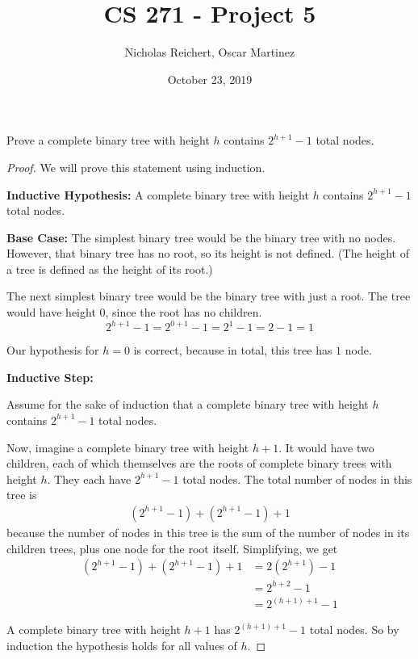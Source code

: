 \documentclass[12pt]{article}
\title{CS 271 - Project 5}
\author{Nicholas Reichert, Oscar Martinez}
\date{October 23, 2019}
\begin{document}
\maketitle

\section{}

Prove a complete binary tree with height $h$ contains $2^{h+1} - 1$ total nodes.

\begin{proof}
We will prove this statement using induction.
\bigskip

\textbf{Inductive Hypothesis: } A complete binary tree with height $h$ contains $2^{h+1} - 1$ total nodes.

\bigskip
\textbf{Base Case: } The simplest binary tree would be the binary tree with no nodes.  However, that binary tree has no root, so its height is not defined. (The height of a tree is defined as the height of its root.)

The next simplest binary tree would be the binary tree with just a root.  The tree would have height $0$, since the root has no children.
\begin{equation}
    2^{h+1} - 1 = 2^{0+1} - 1 = 2^1 - 1 = 2 - 1 = 1
\end{equation}

Our hypothesis for $h=0$ is correct, because in total, this tree has $1$ node.  

\bigskip
\textbf{Inductive Step: }

Assume for the sake of induction that a complete binary tree with height $h$ contains $2^{h+1} - 1$ total nodes.

Now, imagine a complete binary tree with height $h+1$.  It would have two children, each of which themselves are the roots of complete binary trees with height $h$.  They each have $2^{h+1} - 1$ total nodes.  The total number of nodes in this tree is
\begin{align}
    (2^{h+1} - 1) + (2^{h+1} - 1) + 1
\end{align}
because the number of nodes in this tree is the sum of the number of nodes in its children trees, plus one node for the root itself.  Simplifying, we get
\begin{align}
    (2^{h+1} - 1) + (2^{h+1} - 1) + 1 &= 2(2^{h+1}) - 1 \\
    &= 2^{h+2} - 1 \\
    &= 2^{(h+1)+1} - 1
\end{align}

A complete binary tree with height $h+1$ has $2^{(h+1)+1} - 1$ total nodes.  So by induction the hypothesis holds for all values of $h$.

\end{proof}
\setcounter{equation}{0}
\end{document}
